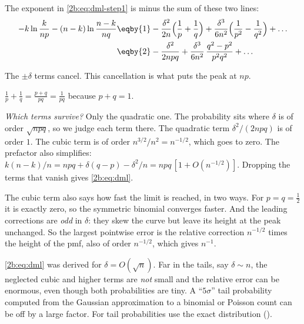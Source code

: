 The exponent in \eqref{2b:eq:dml-step1} is minus the sum of these two lines:
\begin{align}
  -k\ln\frac{k}{np}-(n-k)\ln\frac{n-k}{nq}
  &\eqby{1} -\frac{\delta^2}{2n}\Bigl(\frac1p+\frac1q\Bigr)+\frac{\delta^3}{6n^2}\Bigl(\frac1{p^2}-\frac1{q^2}\Bigr)+\dots \nonumber\\
  &\eqby{2} -\frac{\delta^2}{2npq}+\frac{\delta^3}{6n^2}\,\frac{q^2-p^2}{p^2q^2}+\dots
  \label{2b:eq:dml-exponent}
\end{align}
\begin{explain}
  \item The $\pm\delta$ terms cancel. This cancellation is what puts the peak at $np$.
  \item $\frac1p+\frac1q=\frac{p+q}{pq}=\frac1{pq}$ because $p+q=1$.
\end{explain}
\emph{Which terms survive?} Only the quadratic one. The probability sits where $\delta$ is of order $\sqrt{npq}$, so we judge each term there. The quadratic term $\delta^2/(2npq)$ is of order $1$. The cubic term is of order $n^{3/2}/n^2=n^{-1/2}$, which goes to zero. The prefactor also simplifies: $k(n-k)/n=npq+\delta(q-p)-\delta^2/n=npq\,[1+O(n^{-1/2})]$. Dropping the terms that vanish gives \eqref{2b:eq:dml}.

The cubic term also says how fast the limit is reached, in two ways. For $p=q=\tfrac12$ it is exactly zero, so the symmetric binomial converges faster. And the leading corrections are \emph{odd} in $\delta$: they skew the curve but leave its height at the peak unchanged. So the largest pointwise error is the relative correction $n^{-1/2}$ times the height of the pmf, also of order $n^{-1/2}$, which gives $n^{-1}$.

\begin{pitfall}
\eqref{2b:eq:dml} was derived for $\delta=O(\sqrt n)$. Far in the tails, say $\delta\sim n$, the neglected cubic and higher terms are \emph{not} small and the relative error can be enormous, even though both probabilities are tiny. A ``$5\sigma$'' tail probability computed from the Gaussian approximation to a binomial or Poisson count can be off by a large factor. For tail probabilities use the exact distribution ().
\end{pitfall}

